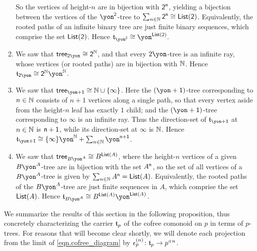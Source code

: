 \documentclass[Book-Poly]{subfiles}
\begin{document}
\begin{exercise}
\begin{solution}
\begin{enumerate}
    So the vertices of height-$n$ are in bijection with $\textsf{2}^{\mathsf{n}}$, yielding a bijection between the vertices of the $\yon^\2$-tree to $\sum_{n\in\mathbb{N}}\textsf{2}^{\mathsf{n}}\cong\mathsf{List}(\textsf{2})$.
    Equivalently, the rooted paths of an infinite binary tree are just finite binary sequences, which comprise the set $\mathsf{List}(\textsf{2})$.
    Hence $\ema{t}_{\yon^\2}\iso\yon^{\lst(\2)}$.
    \item We saw that $\tr_{\2\yon}\iso\2^\nn$, and that every $2\yon$-tree is an infinite ray, whose vertices (or rooted paths) are in bijection with $\mathbb{N}$.
    Hence $\ema{t}_{\2\yon}\iso\2^\nn\yon^\nn$.
    \item We saw that $\tr_{\yon+\1}\iso\nn\cup\{\infty\}$.
    Here the $(\yon+\1)$-tree corresponding to $n\in\mathbb{N}$ consists of $n+1$ vertices along a single path, so that every vertex aside from the height-$n$ leaf has exactly $1$ child; and the $(\yon+\1)$-tree corresponding to $\infty$ is an infinite ray.
    Thus the direction-set of $\ema{t}_{\yon+\1}$ at $n\in\mathbb{N}$ is $\mathsf{n}+\textsf{1}$, while its direction-set at $\infty$ is $\mathbb{N}$.
    Hence $\ema{t}_{\yon+\1}\iso\{\infty\}\yon^\nn+\sum_{n\in\nn}\yon^{\ord{n}+\1}$.
    \item We saw that $\tr_{B\yon^A}\iso B^{\lst(A)}$, where the height-$n$ vertices of a given $B\yon^A$-tree are in bijection with the set $A^{\mathsf{n}}$, so the set of all vertices of a $B\yon^A$-tree is given by $\sum_{n\in\mathbb{N}}A^{\mathsf{n}}=\mathsf{List}(A)$.
    Equivalently, the rooted paths of the $B\yon^A$-tree are just finite sequences in $A$, which comprise the set $\mathsf{List}(A)$.
    Hence $\ema{t}_{B\yon^A}\iso B^{\lst(A)}\yon^{\lst(A)}$.
\end{enumerate}
\end{solution}
\end{exercise}

We summarize the results of this section in the following proposition, thus concretely characterizing the carrier $\mathfrak{t}_p$ of the cofree comonoid on $p$ in terms of $p$-trees.
For reasons that will become clear shortly, we will denote each projection from the limit of \eqref{eqn.cofree_diagram} by $\epsilon^{(n)}_p\colon\mathfrak{t}_p\to p^{\mathbin{\triangleleft}\,n}$.
\end{document}
